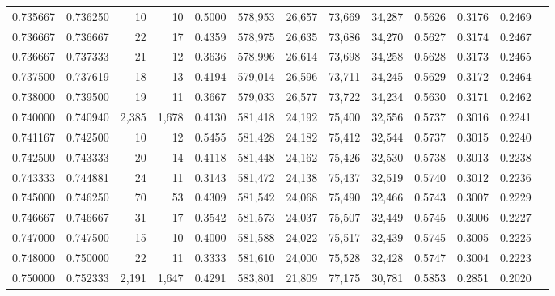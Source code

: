 \begin{tabular}{rrrrrrrrrrrrr}
0.735667 & 0.736250 &     10 &    10 &                                     0.5000 & 578,953 &  26,657 &  73,669 &  34,287 & 0.5626 & 0.3176 & 0.2469 \\
0.736667 & 0.736667 &     22 &    17 &                                     0.4359 & 578,975 &  26,635 &  73,686 &  34,270 & 0.5627 & 0.3174 & 0.2467 \\
0.736667 & 0.737333 &     21 &    12 &                                     0.3636 & 578,996 &  26,614 &  73,698 &  34,258 & 0.5628 & 0.3173 & 0.2465 \\
0.737500 & 0.737619 &     18 &    13 &                                     0.4194 & 579,014 &  26,596 &  73,711 &  34,245 & 0.5629 & 0.3172 & 0.2464 \\
0.738000 & 0.739500 &     19 &    11 &                                     0.3667 & 579,033 &  26,577 &  73,722 &  34,234 & 0.5630 & 0.3171 & 0.2462 \\
0.740000 & 0.740940 &  2,385 & 1,678 &                                     0.4130 & 581,418 &  24,192 &  75,400 &  32,556 & 0.5737 & 0.3016 & 0.2241 \\
0.741167 & 0.742500 &     10 &    12 &                                     0.5455 & 581,428 &  24,182 &  75,412 &  32,544 & 0.5737 & 0.3015 & 0.2240 \\
0.742500 & 0.743333 &     20 &    14 &                                     0.4118 & 581,448 &  24,162 &  75,426 &  32,530 & 0.5738 & 0.3013 & 0.2238 \\
0.743333 & 0.744881 &     24 &    11 &                                     0.3143 & 581,472 &  24,138 &  75,437 &  32,519 & 0.5740 & 0.3012 & 0.2236 \\
0.745000 & 0.746250 &     70 &    53 &                                     0.4309 & 581,542 &  24,068 &  75,490 &  32,466 & 0.5743 & 0.3007 & 0.2229 \\
0.746667 & 0.746667 &     31 &    17 &                                     0.3542 & 581,573 &  24,037 &  75,507 &  32,449 & 0.5745 & 0.3006 & 0.2227 \\
0.747000 & 0.747500 &     15 &    10 &                                     0.4000 & 581,588 &  24,022 &  75,517 &  32,439 & 0.5745 & 0.3005 & 0.2225 \\
0.748000 & 0.750000 &     22 &    11 &                                     0.3333 & 581,610 &  24,000 &  75,528 &  32,428 & 0.5747 & 0.3004 & 0.2223 \\
0.750000 & 0.752333 &  2,191 & 1,647 &                                     0.4291 & 583,801 &  21,809 &  77,175 &  30,781 & 0.5853 & 0.2851 & 0.2020 \\

\end{tabular}
